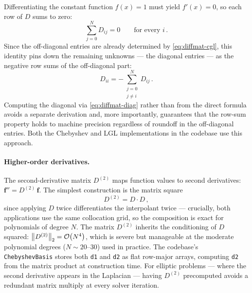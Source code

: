 Differentiating the constant function $f(x) = 1$ must yield
$f'(x) = 0$, so each row of $D$ sums to zero:
%
\begin{equation}
  \sum_{j=0}^{N} D_{ij} = 0 \qquad
  \text{for every } i \,.
  \label{eq:diffmat-rowsum}
\end{equation}
%
Since the off-diagonal entries are already determined by
\cref{eq:diffmat-cgl}, this identity pins down the remaining
unknowns --- the diagonal entries --- as the negative row sums of
the off-diagonal part:
%
\begin{equation}
  D_{ii} = -\sum_{\substack{j=0 \\ j \neq i}}^{N} D_{ij} \,.
  \label{eq:diffmat-diag}
\end{equation}
%
Computing the diagonal via \cref{eq:diffmat-diag} rather than from
the direct formula avoids a separate derivation and,
more importantly, guarantees that the row-sum property holds to
machine precision regardless of roundoff in the off-diagonal
entries.  Both the Chebyshev and LGL implementations in the
codebase use this approach.

\paragraph{Higher-order derivatives.}

The second-derivative matrix $D^{(2)}$ maps function values to second
derivatives: $\mathbf{f}'' = D^{(2)}\,\mathbf{f}$.  The simplest
construction is the matrix square
%
\begin{equation}
  D^{(2)} = D \cdot D \,,
  \label{eq:diffmat-d2}
\end{equation}
%
since applying $D$ twice differentiates the interpolant twice ---
crucially, both applications use the same collocation grid, so the
composition is exact for polynomials of degree $N$.  The matrix
$D^{(2)}$ inherits the conditioning of $D$ squared:
$\left\lVert D^{(2)} \right\rVert_2 = \mathcal{O}\!\left(N^4\right)$, which is severe but manageable
at the moderate polynomial degrees ($N \sim 20$--$30$) used in
practice.  The codebase's \texttt{ChebyshevBasis} stores both
\texttt{d1} and \texttt{d2} as flat row-major arrays, computing
\texttt{d2} from the matrix product at construction time.  For
elliptic problems --- where the second derivative appears in the
Laplacian --- having $D^{(2)}$ precomputed avoids a redundant
matrix multiply at every solver iteration.

